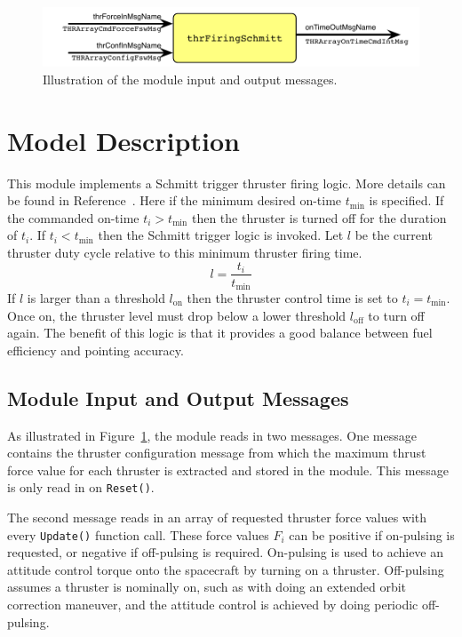 

\begin{figure}[h]
	\centerline{
		\includegraphics{Figures/moduleImg}
	}
	\caption{Illustration of the module input and output messages.}
	\label{fig:moduleImg}
\end{figure}


\section{Model Description}
This module implements a Schmitt trigger thruster firing logic.  More details can be found in Reference~.    Here if the minimum desired on-time $t_{\text{min}}$ is specified.  If the commanded on-time $t_{i}>t_{\text{min}}$ then the thruster is turned off for the duration of $t_{i}$.  If $t_{i}< t_{\text{min}}$ then the Schmitt trigger logic is invoked.  Let $l$ be the current thruster duty cycle relative to this minimum thruster firing time.
$$
	l = \frac{t_{i}}{t_{\text{min}}}
$$
If $l$ is larger than a threshold $l_{\text{on}}$ then the thruster control time is set to $t_{i} = t_{\text{min}}$.  Once on, the thruster level must drop below a lower threshold $l_{\text{off}}$ to turn off again.  The benefit of this logic is that it provides a good balance between fuel efficiency and pointing accuracy.  


\subsection{Module Input and Output Messages}
As illustrated in Figure~\ref{fig:moduleImg}, the module reads in two messages.  One message contains the thruster configuration message from which the maximum thrust force value for each thruster is extracted and stored in the module.  This message is only read in on {\tt Reset()}.  

The second message reads in an array of requested thruster force values with every {\tt Update()} function call.  These force values $F_{i}$ can be positive if on-pulsing is requested, or negative if off-pulsing is required.  On-pulsing is used to achieve an attitude control torque onto the spacecraft by turning on a thruster.  Off-pulsing assumes a thruster is nominally on, such as with doing an extended orbit correction maneuver, and the attitude control is achieved by doing periodic off-pulsing.  

